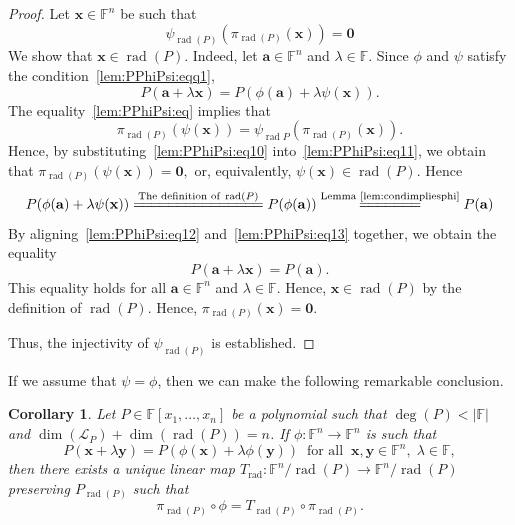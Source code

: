 \documentclass{elsarticle}
\DeclareMathOperator{\rad}{rad}
\def\F{{\mathbb F}}
\newtheorem{corollary}[theorem]{Corollary}
\theoremstyle{definition}
\numberwithin{equation}{section}
\begin{document}
\begin{proof}
Let $\mathbf x \in \F^n$ be such that 
\begin{equation}\label{lem:PPhiPsi:eq10}
\psi_{\rad(P)}(\pi_{\rad(P)}(\mathbf x)) = \mathbf 0
\end{equation}
We show that $\mathbf x \in \rad(P)$. Indeed, let $\mathbf a \in \F^n$ and $\lambda \in \F$. Since $\phi$ and $\psi$ satisfy the condition~\eqref{lem:PPhiPsi:eqq1},
\begin{equation}\label{lem:PPhiPsi:eq12}
P(\mathbf a + \lambda \mathbf x) = P(\phi(\mathbf a) + \lambda \psi(\mathbf x)).
\end{equation}
The equality~\eqref{lem:PPhiPsi:eq} implies that
\begin{equation}\label{lem:PPhiPsi:eq11}
\pi_{\rad(P)} \left(\psi(\mathbf x)\right) = \psi_{\rad{P}} \left(\pi_{\rad(P)}(\mathbf x)\right).
\end{equation}
Hence, by substituting~\eqref{lem:PPhiPsi:eq10} into~\eqref{lem:PPhiPsi:eq11}, we obtain that
$\pi_{\rad(P)} \left(\psi(\mathbf x)\right) = \mathbf 0,$
or, equivalently,
$
\psi(\mathbf x)  \in \rad(P).
$
Hence
\begin{equation}\label{lem:PPhiPsi:eq13}
P(\phi(\mathbf a) + \lambda \psi(\mathbf x)) \overset{\mbox{\scriptsize The definition of}\;\rad(P)}{=\joinrel=\joinrel=\joinrel=\joinrel=\joinrel=\joinrel=\joinrel=\joinrel=\joinrel=\joinrel=\joinrel=\joinrel=\joinrel=\joinrel=} P(\phi(\mathbf a)) \overset{\mbox{\scriptsize Lemma~\ref{lem:condimpliesphi}}}{=\joinrel=\joinrel=\joinrel=\joinrel=\joinrel=\joinrel=} P(\mathbf a)
\end{equation}
By aligning~\eqref{lem:PPhiPsi:eq12} and~\eqref{lem:PPhiPsi:eq13} together, we obtain the equality
\[
P(\mathbf a + \lambda \mathbf x) = P(\mathbf a).
\]
This equality holds for all $\mathbf a \in \F^n$ and $\lambda \in \F$. Hence, $\mathbf x \in \rad(P)$ by the definition of $\rad(P)$. Hence, $\pi_{\rad(P)}(\mathbf x) = \mathbf 0$. 

Thus, the injectivity of $\psi_{\rad(P)}$ is established.
\end{proof}

If we assume that $\psi = \phi$, then we can make the following remarkable conclusion.


\begin{corollary}Let $P \in \F[x_1,\ldots, x_n]$ be a polynomial such that $\deg (P) < |\F|$ and $\dim (\mathcal L_P) + \dim (\rad(P)) = n$.  If  $\phi\colon \F^n \to \F^n$ is such that
\begin{equation*}
P(\mathbf{x} + \lambda \mathbf{y}) = P(\phi(\mathbf{x}) + \lambda \phi(\mathbf{y}))\;\;\mbox{for all}\;\;\mathbf{x},\mathbf{y} \in \mathbb \F^n,\; \lambda \in \F,
\end{equation*}
then there exists a unique linear map $T_{\rad} \colon \F^n/\rad(P) \to \F^n/\rad(P)$ preserving $P_{\rad(P)}$ such that
\begin{equation*}
\pi_{\rad(P)} \circ \phi = T_{\rad(P)} \circ \pi_{\rad(P)}. 
\end{equation*}
\end{corollary}
\end{document}
